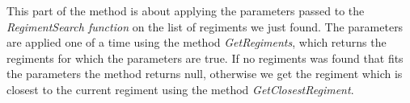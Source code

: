 	This part of the method is about applying the parameters passed to the {\it RegimentSearch function} on the list of regiments we just found. 
	The parameters are applied one of a time using the method \textit{GetRegiments}, which returns the regiments for which the parameters are true. 
	If no regiments was found that fits the parameters the method returns null, otherwise we get the regiment which is closest to the current regiment 
	using the method \textit{GetClosestRegiment}. 